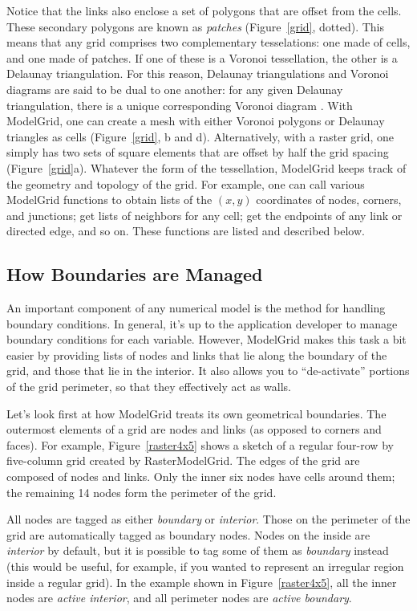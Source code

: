 \documentclass[12pt]{article}
\begin{document}
Notice that the links also enclose a set of polygons that are offset from the cells. These secondary polygons are known as {\em patches} (Figure~\ref{grid}, dotted). This means that any grid comprises two complementary tesselations: one made of cells, and one made of patches. If one of these is a Voronoi tessellation, the other is a Delaunay triangulation. For this reason, Delaunay triangulations and Voronoi diagrams are said to be dual to one another: for any given Delaunay triangulation, there is a unique corresponding Voronoi diagram \citep[e.g.,][]{braun1997modelling,tucker2001object}. With ModelGrid, one can create a mesh with either Voronoi polygons or Delaunay triangles as cells (Figure~\ref{grid}, b and d). Alternatively, with a raster grid, one simply has two sets of square elements that are offset by half the grid spacing (Figure~\ref{grid}a). Whatever the form of the tessellation, ModelGrid keeps track of the geometry and topology of the grid. For example, one can call various ModelGrid functions to obtain lists of the $(x,y)$ coordinates of nodes, corners, and junctions; get lists of neighbors for any cell; get the endpoints of any link or directed edge, and so on. These functions are listed and described below. 

\subsection{How Boundaries are Managed}

An important component of any numerical model is the method for handling boundary conditions. In general, it's up to the application developer to manage boundary conditions for each variable. However, ModelGrid makes this task a bit easier by providing lists of nodes and links that lie along the boundary of the grid, and those that lie in the interior. It also allows you to ``de-activate'' portions of the grid perimeter, so that they effectively act as walls.

Let's look first at how ModelGrid treats its own geometrical boundaries. The outermost elements of a grid are nodes and links (as opposed to corners and faces). For example, Figure~\ref{raster4x5} shows a sketch of a regular four-row by five-column grid created by RasterModelGrid. The edges of the grid are composed of nodes and links. Only the inner six nodes have cells around them; the remaining 14 nodes form the perimeter of the grid.

All nodes are tagged as either {\em boundary} or {\em interior}. Those on the perimeter of the grid are automatically tagged as boundary nodes. Nodes on the inside are {\em interior} by default, but it is possible to tag some of them as {\em boundary} instead (this would be useful, for example, if you wanted to represent an irregular region inside a regular grid). In the example shown in Figure~\ref{raster4x5}, all the inner nodes are {\em active interior}, and all perimeter nodes are {\em active boundary}. 
\end{document}
